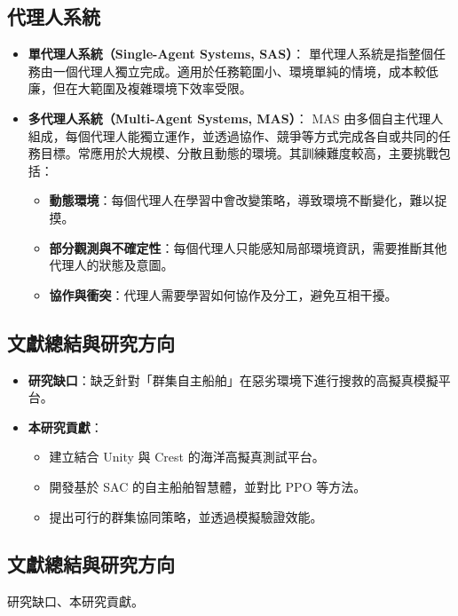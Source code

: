 \documentclass[12pt,a4paper]{ctexart}
\begin{document}
\subsection{代理人系統}

\begin{itemize}
  \item \textbf{單代理人系統（Single-Agent Systems, SAS）}：
  單代理人系統是指整個任務由一個代理人獨立完成。適用於任務範圍小、環境單純的情境，成本較低廉，但在大範圍及複雜環境下效率受限。
  
  \item \textbf{多代理人系統（Multi-Agent Systems, MAS）}：
  MAS 由多個自主代理人組成，每個代理人能獨立運作，並透過協作、競爭等方式完成各自或共同的任務目標。常應用於大規模、分散且動態的環境。其訓練難度較高，主要挑戰包括：
  \begin{itemize}
    \item \textbf{動態環境}：每個代理人在學習中會改變策略，導致環境不斷變化，難以捉摸。
    \item \textbf{部分觀測與不確定性}：每個代理人只能感知局部環境資訊，需要推斷其他代理人的狀態及意圖。
    \item \textbf{協作與衝突}：代理人需要學習如何協作及分工，避免互相干擾。
  \end{itemize}
\end{itemize}

\subsection{文獻總結與研究方向}

\begin{itemize}
  \item \textbf{研究缺口}：缺乏針對「群集自主船舶」在惡劣環境下進行搜救的高擬真模擬平台。
  \item \textbf{本研究貢獻}：
  \begin{itemize}
    \item 建立結合 Unity 與 Crest 的海洋高擬真測試平台。
    \item 開發基於 SAC 的自主船舶智慧體，並對比 PPO 等方法。
    \item 提出可行的群集協同策略，並透過模擬驗證效能。
  \end{itemize}
\end{itemize}


\subsection{文獻總結與研究方向}
研究缺口、本研究貢獻。
\end{document}
